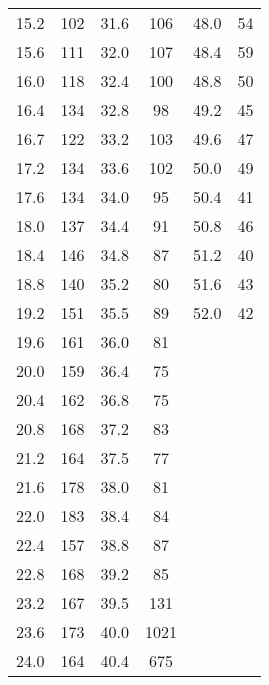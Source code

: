 \begin{table}[htp]
\begin{center}
\begin{tabular}{S[table-format=2.1] S[table-format=3.0] S[table-format=2.1] S[table-format=3.0] S[table-format=2.1] S[table-format=3.0]}
                        15.2 & 102 & 31.6 &  106 & 48.0 &   54   \\
                        15.6 & 111 & 32.0 &  107 & 48.4 &   59   \\
                        16.0 & 118 & 32.4 &  100 & 48.8 &   50   \\
                        16.4 & 134 & 32.8 &   98 & 49.2 &   45   \\
                        16.7 & 122 & 33.2 &  103 & 49.6 &   47   \\
                        17.2 & 134 & 33.6 &  102 & 50.0 &   49   \\
                        17.6 & 134 & 34.0 &   95 & 50.4 &   41   \\
                        18.0 & 137 & 34.4 &   91 & 50.8 &   46   \\
                        18.4 & 146 & 34.8 &   87 & 51.2 &   40   \\
                        18.8 & 140 & 35.2 &   80 & 51.6 &   43   \\
                        19.2 & 151 & 35.5 &   89 & 52.0 &   42   \\
                        19.6 & 161 & 36.0 &   81 &      &          \\
                        20.0 & 159 & 36.4 &   75 &      &          \\
                        20.4 & 162 & 36.8 &   75 &      &          \\
                        20.8 & 168 & 37.2 &   83 &      &          \\
                        21.2 & 164 & 37.5 &   77 &      &          \\
                        21.6 & 178 & 38.0 &   81 &      &          \\
                        22.0 & 183 & 38.4 &   84 &      &          \\
                        22.4 & 157 & 38.8 &   87 &      &          \\
                        22.8 & 168 & 39.2 &   85 &      &          \\
                        23.2 & 167 & 39.5 &  131 &      &          \\
                        23.6 & 173 & 40.0 & 1021 &      &          \\
                        24.0 & 164 & 40.4 &  675 &      &          \\
                \bottomrule
                \end{tabular}
        \end{center}
\end{table}

